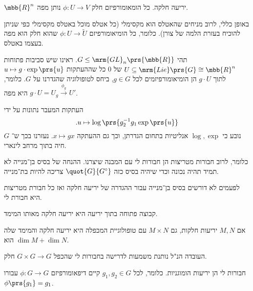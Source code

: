 \documentclass[10pt, twoside]{book}
\newcommand{\Lie}{\mrm{Lie}}
\begin{document}
\begin{example}
$\mbb{R}^n$
יריעה חלקה. כל הומאומורפיזם חלק
$\phi \colon U \to V$
נותן מפה.
\end{example}

\begin{remark}
באופן כללי, לרוב מניחים שהאטלס הוא מקסימלי (כל אטלס מוכל באטלס מקסימלי כפי שניתן להוכיח בעזרת הלמה של צורן). כלומר, כל הומיאומורפיזם
$\phi \colon U \to \tilde{U}$
שהוא חלק הוא מפה בעצמו באטלס.
\end{remark}

\begin{example}
תהי
$G \leq \mrm{GL}_n\prs{\mbb{R}}$.
ראינו שיש סביבות פתוחות
$U \subseteq \Lie\prs{G} \cong \mbb{R}^n$
של
$0$
כל שההעתקות
$u \mapsto g \cdot \exp\prs{u}$
לתוך
$g \cdot U$
הן הומיאומורפיזמים לכל
$g \in G$,
ביחס לטופולוגיה שהגדרנו על
$G$.
כלומר,
$g \cdot U = U_g \xrightarrow{\phi_g} U'$
היא מפה.

העתקות המעבר נתונות על ידי
\[\text{.} u \mapsto \log\prs{g_2^{-1} g_1 \exp\prs{u}}\]
נובע כי
$\log,\exp$
אנליטיות בתחום הגדרתן, וכך גם ההעתקה
$x \mapsto gx$.
נעזרנו בכך ש־%
$G$
חיה בתוך מרחב לינארי.

כלומר, לרוב חבורות מטריצות הן חבורות לי עם המבנה שיצרנו. ההנחה של בסיס בן־מנייה לא תמיד תהיה נכונה וכדי שיהיה בסיס כזה
$\quot{G}{G^\circ}$
צריכה להיות בת־מנייה.
\end{example}

\begin{remark}
לפעמים לא דורשים בסיס בן־מנייה עבור ההגדרה של יריעה חלקה ואז כל חבורת מטריצות היא חבורת לי.
\end{remark}

\begin{fact}
קבוצה פתוחה בתוך יריעה היא יריעה חלקה מאותו המימד.
\end{fact}

\begin{fact}
אם
$M,N$
יריעות חלקות, גם
$M \times N$
עם טופולוגיית המכפלה היא יריעה חלקה והמימד שלה הוא
$\dim M + \dim N$.
\end{fact}

\begin{remark}
העובדה הנ"ל נותנת משמעות לדרישה בחבורות לי שהכפל
$G \times G \to G$
חלק.
\end{remark}

\begin{remark}
חבורות לי הן יריעות הומוגניות. כלומר, לכל
$g_1,g_2 \in G$
קיים דיפאומורפיזם
$\phi \colon G \to G$
עבורו
$\phi\prs{g_1} = g_1$.
\end{remark}
\end{document}
